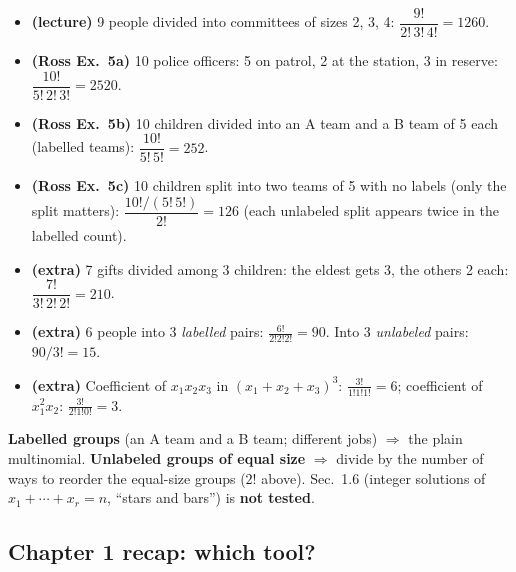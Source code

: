 \documentclass[11pt]{article}
\let\oldsubsection\subsection
\renewcommand{\subsection}{\Needspace{14\baselineskip}\oldsubsection}
\begin{document}
\begin{exbox}[Examples]
\begin{itemize}
\item \textbf{(lecture)} 9 people divided into committees of sizes 2, 3, 4: $\dfrac{9!}{2!\,3!\,4!}=1260$.
\item \textbf{(Ross Ex.\ 5a)} 10 police officers: 5 on patrol, 2 at the station, 3 in reserve: $\dfrac{10!}{5!\,2!\,3!}=2520$.
\item \textbf{(Ross Ex.\ 5b)} 10 children divided into an A team and a B team of 5 each (labelled teams): $\dfrac{10!}{5!\,5!}=252$.
\item \textbf{(Ross Ex.\ 5c)} 10 children split into two teams of 5 with no labels (only the split matters): $\dfrac{10!/(5!\,5!)}{2!}=126$ (each unlabeled split appears twice in the labelled count).
\item \textbf{(extra)} 7 gifts divided among 3 children: the eldest gets 3, the others 2 each: $\dfrac{7!}{3!\,2!\,2!}=210$.
\item \textbf{(extra)} 6 people into 3 \emph{labelled} pairs: $\frac{6!}{2!2!2!}=90$. Into 3 \emph{unlabeled} pairs: $90/3!=15$.
\item \textbf{(extra)} Coefficient of $x_1x_2x_3$ in $(x_1+x_2+x_3)^3$: $\frac{3!}{1!1!1!}=6$; coefficient of $x_1^2x_2$: $\frac{3!}{2!1!0!}=3$.
\end{itemize}
\end{exbox}

\begin{warnbox}
\textbf{Labelled groups} (an A team and a B team; different jobs) $\Rightarrow$ the plain multinomial. \textbf{Unlabeled groups of equal size} $\Rightarrow$ divide by the number of ways to reorder the equal-size groups ($2!$ above). Sec.~1.6 (integer solutions of $x_1+\cdots+x_r=n$, ``stars and bars'') is \textbf{not tested}.
\end{warnbox}

\subsection{Chapter 1 recap: which tool?}
\end{document}

